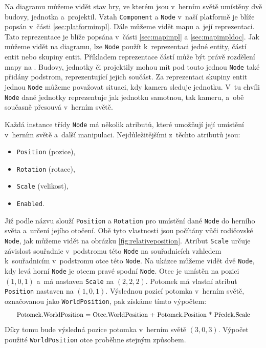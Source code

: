 Na diagramu můžeme vidět stav hry, ve kterém jsou v~herním světě umístěny dvě budovy, jednotka a~projektil. Vztah \texttt{Component} a \texttt{Node} v~naší platformě je blíže popsán v~části \ref{sec:platformimpl}. Dále můžeme vidět mapu a~její reprezentaci. Tato reprezentace je blíže popsána v~části \ref{sec:mapimpl} a \ref{sec:mapimpldoc}. Jak můžeme vidět na diagramu, lze \texttt{Node} použít k~reprezentaci jedné entity, částí entit nebo skupiny entit. Příkladem reprezentace částí může být právě rozdělení mapy na . Budovy, jednotky či projektily mohou mít pod touto jednou \texttt{Node} také přidány podstrom, reprezentující jejich součást. Za reprezentaci skupiny entit jednou \texttt{Node} můžeme považovat situaci, kdy kamera sleduje jednotku. V~tu chvíli \texttt{Node} dané jednotky reprezentuje jak jednotku samotnou, tak kameru, a~obě současně přesouvá v~herním světě.



Každá instance třídy \texttt{Node} má několik atributů, které umožňují její umístění v~herním světě a~další manipulaci. Nejdůležitějšími z~těchto atributů jsou:

\begin{itemize}
	\item \texttt{Position} (pozice),
	\item \texttt{Rotation} (rotace),
	\item \texttt{Scale} (velikost),
	\item \texttt{Enabled}.
\end{itemize}

Již podle názvu slouží \texttt{Position} a \texttt{Rotation} pro umístění dané \texttt{Node} do herního světa a~určení jejího otočení. Obě tyto vlastnosti jsou počítány vůči rodičovské \texttt{Node}, jak můžeme vidět na obrázku \ref{fig:relativeposition}. Atribut \texttt{Scale} určuje závislost souřadnic v~podstromu této \texttt{Node} na souřadnicích vzhledem k~souřadnicím v~podstromu otce této \texttt{Node}. Na ukázce můžeme vidět dvě \texttt{Node}, kdy levá horní \texttt{Node} je otcem pravé spodní \texttt{Node}. Otec je umístěn na pozici \((1,0,1)\) a~má nastaven \texttt{Scale} na \((2,2,2)\). Potomek má vlastní atribut \texttt{Position} nastaven na \((1,0,1)\). Výslednou pozicí potomka v~herním světě, označovanou jako \texttt{WorldPosition}, pak získáme tímto výpočtem:\[\scalebox{0.9}{Potomek.WorldPosition = Otec.WorldPosition + Potomek.Position * Předek.Scale}\] Díky tomu bude výsledná pozice potomka v~herním světě \((3,0,3)\). Výpočet použité \texttt{WorldPosition} otce proběhne stejným způsobem.

